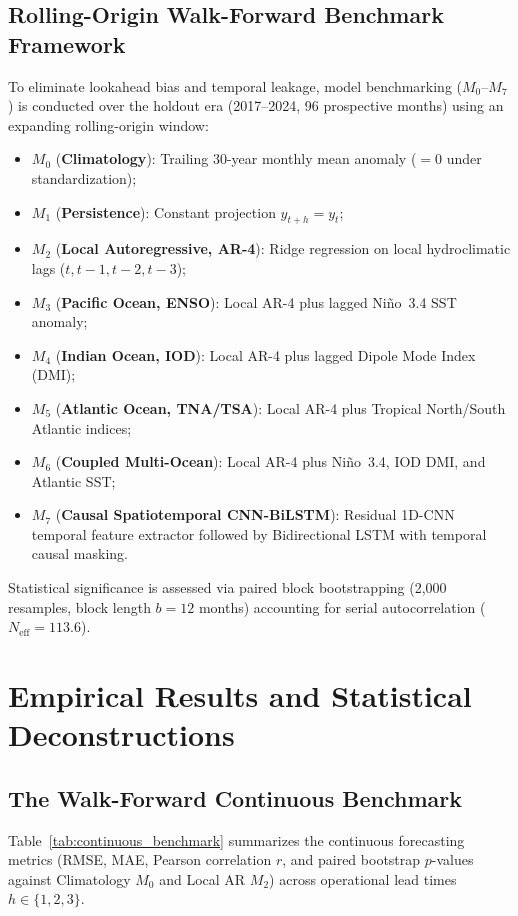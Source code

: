 \documentclass{article}
\begin{document}
\subsection{Rolling-Origin Walk-Forward Benchmark Framework}
To eliminate lookahead bias and temporal leakage, model benchmarking ($M_0$--$M_7$) is conducted over the holdout era (2017--2024, 96 prospective months) using an expanding rolling-origin window:
\begin{itemize}
    \item $M_0$ (\textbf{Climatology}): Trailing 30-year monthly mean anomaly ($= 0$ under standardization);
    \item $M_1$ (\textbf{Persistence}): Constant projection $y_{t+h} = y_t$;
    \item $M_2$ (\textbf{Local Autoregressive, AR-4}): Ridge regression on local hydroclimatic lags ($t, t-1, t-2, t-3$);
    \item $M_3$ (\textbf{Pacific Ocean, ENSO}): Local AR-4 plus lagged Ni\~{n}o~3.4 SST anomaly;
    \item $M_4$ (\textbf{Indian Ocean, IOD}): Local AR-4 plus lagged Dipole Mode Index (DMI);
    \item $M_5$ (\textbf{Atlantic Ocean, TNA/TSA}): Local AR-4 plus Tropical North/South Atlantic indices;
    \item $M_6$ (\textbf{Coupled Multi-Ocean}): Local AR-4 plus Ni\~{n}o~3.4, IOD DMI, and Atlantic SST;
    \item $M_7$ (\textbf{Causal Spatiotemporal CNN-BiLSTM}): Residual 1D-CNN temporal feature extractor followed by Bidirectional LSTM with temporal causal masking.
\end{itemize}
Statistical significance is assessed via paired block bootstrapping (2,000 resamples, block length $b = 12$ months) accounting for serial autocorrelation ($N_{\text{eff}} = 113.6$).

\section{Empirical Results and Statistical Deconstructions}
\label{sec:results}

\subsection{The Walk-Forward Continuous Benchmark}
Table~\ref{tab:continuous_benchmark} summarizes the continuous forecasting metrics (RMSE, MAE, Pearson correlation $r$, and paired bootstrap $p$-values against Climatology $M_0$ and Local AR $M_2$) across operational lead times $h \in \{1, 2, 3\}$.
\end{document}
